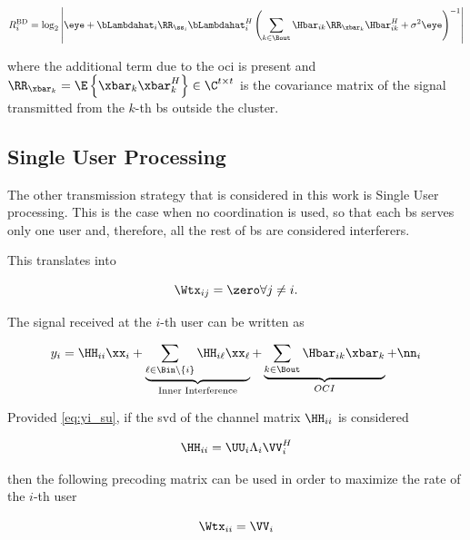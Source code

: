 \begin{equation} \label{eq:bd_rate_oci}
    R_{i}^{\text{BD}} = \log_2\left|\eye + \bLambdahat_i \RR_{\ss_i}
    \bLambdahat_i^H \left(\sum\limits_{k \in \Bout} \Hbar_{ik} \RR_{\xbar_k}
    \Hbar_{ik}^H + \sigma^2\eye\right)^{-1}\right|
\end{equation}

\noindent
where the additional term due to the \gls{oci} is present and $\RR_{\xbar_k} =
\E\left\{\xbar_k \xbar_k^H\right\} \in \C^{t \times t}$ is the covariance matrix
of the signal transmitted from the $k$-th \gls{bs} outside the cluster.

\subsection{Single User Processing} \label{ssec:sched_su}

The other transmission strategy that is considered in this work is Single User
processing. This is the case when no coordination is used, so that each \gls{bs}
serves only one user and, therefore, all the rest of \gls{bs} are considered
interferers.

This translates into

\begin{equation} \label{eq:wtx_su}
    \Wtx_{ij} = \zero \forall j \neq i.
\end{equation}

The signal received at the $i$-th user can be written as

\begin{equation} \label{eq:yi_su}
    y_i = \HH_{ii}\xx_i + \underbrace{\sum\limits_{\ell \in \Bin \backslash
    \left\{i\right\}} \HH_{i\ell} \xx_{\ell}}_{\text{Inner Interference}} +
    \underbrace{\sum\limits_{k \in \Bout} \Hbar_{ik} \xbar_k}_{OCI} + \nn_i
\end{equation}

Provided \eqref{eq:yi_su}, if the \gls{svd} of the channel matrix $\HH_{ii}$ is
considered

\begin{equation} \label{eq:hi_svd}
    \HH_{ii} = \UU_i \Lambda_i \VV_i^H
\end{equation}

\noindent
then the following precoding matrix can be used in order to maximize the rate of
the $i$-th user \cite{telatar99}

\begin{equation} \label{eq:precod_su}
    \Wtx_{ii} = \VV_i
\end{equation}


